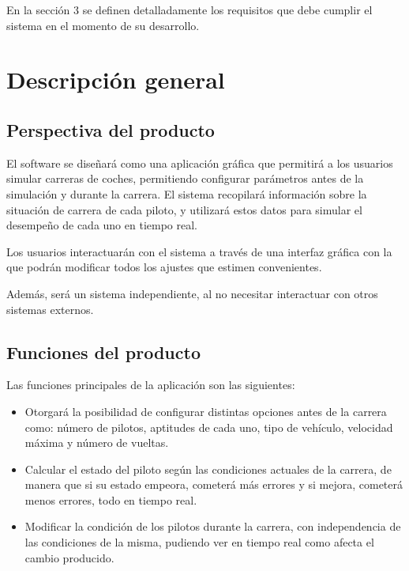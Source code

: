 En la sección 3 se definen detalladamente los requisitos que debe cumplir el sistema en el momento de su desarrollo.

\section{Descripción general}
\subsection{Perspectiva del producto}
El software se diseñará como una aplicación gráfica que permitirá a los usuarios simular carreras de coches, permitiendo configurar parámetros antes de la simulación y durante la carrera. El sistema recopilará información sobre la situación de carrera de cada piloto, y utilizará estos datos para simular el desempeño de cada uno en tiempo real.

\bigskip

Los usuarios interactuarán con el sistema a través de una interfaz gráfica con la que podrán modificar todos los ajustes que estimen convenientes.

\bigskip

Además, será un sistema independiente, al no necesitar interactuar con otros sistemas externos.

\subsection{Funciones del producto}

Las funciones principales de la aplicación son las siguientes:

\begin{itemize}
    \item 
    Otorgará la posibilidad de configurar distintas opciones antes de la carrera como: número de pilotos, aptitudes de cada uno, tipo de vehículo, velocidad máxima y número de vueltas. 
    
    \item Calcular el estado del piloto según las condiciones actuales de la carrera, de manera que si su estado empeora, cometerá más errores y si mejora, cometerá menos errores, todo en tiempo real.
    
    \item Modificar la condición de los pilotos durante la carrera, con independencia de las condiciones de la misma, pudiendo ver en tiempo real como afecta el cambio producido.
\end{itemize}

